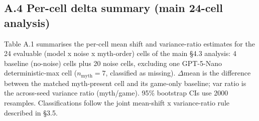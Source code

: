 \documentclass[10pt,letterpaper]{article}
\begin{document}
\subsection{A.4 Per-cell delta summary (main 24-cell
analysis)}\label{a.4-per-cell-delta-summary-main-24-cell-analysis}

Table A.1 summarises the per-cell mean shift and variance-ratio
estimates for the 24 evaluable (model x noise x myth-order) cells of the
main §4.3 analysis: 4 baseline (no-noise) cells plus 20 noise cells,
excluding one GPT-5-Nano deterministic-max cell
(\(n_{\text{myth}} = 7\), classified as missing). \(\Delta\)mean is the
difference between the matched myth-present cell and its game-only
baseline; var ratio is the across-seed variance ratio (myth/game). 95\%
bootstrap CIs use 2000 resamples. Classifications follow the joint
mean-shift x variance-ratio rule described in §3.5.
\end{document}
